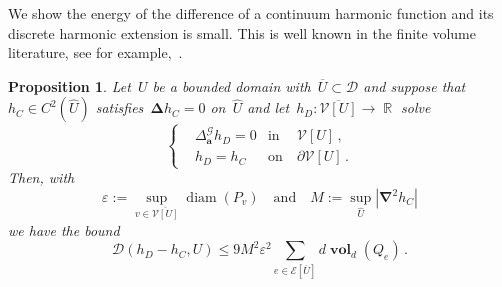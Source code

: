 \documentclass[12pt]{amsart}
\numberwithin{equation}{section}
\DeclareMathOperator{\R}{\mathbb{R}}
\DeclareMathOperator{\diam}{{\mathop{diam}}}
\newtheorem{prop}[theorem]{Proposition}
\newcommand{\V}{\mathcal{V}}
\newcommand{\E}{\mathcal{E}}
\newcommand{\eps}{\varepsilon}
\newcommand{\CLap}{\boldsymbol{\Delta}}
\newcommand{\Cnabla}{\boldsymbol{\nabla}}
\newcommand{\aDelta}{\hyperref[eq:geometric-laplacian]{{\Delta^{\mathcal{G}}_{\cond}}}}
\newcommand{\cond}{\hyperref[eq:geometric-laplacian]{\mathbf{a}}}
\newcommand{\D}{\hyperref[eq:dir.energy]{\mathcal{D}}}
\newcommand{\GCU}{\hyperref[eq:graph-closure]{\widehat{U}}}
\newcommand{\Qe}{\hyperref[eq:qeset]{Q_e}}
\DeclareMathOperator{\vol}{\mathbf{vol}}
\begin{document}
We show the energy of the difference of a continuum harmonic function and its discrete harmonic extension is small. This is well known in the finite volume literature, see for example,~\cite[Theorem 9.3]{eymard2000finite}.
\begin{prop}
	\label{prop:energy-bound}
	Let~$U$ be a bounded domain with~$\overline{U} \subset \mathcal{D}$ and suppose that~$h_C \in C^{2}(\GCU)$ satisfies~$\CLap h_C = 0$ on~$\GCU$ and let~$h_D: \overline{\V[U]} \to \R$ solve 
	\[
	\left\{
	\begin{aligned}
		&  \aDelta h_D = 0 & \mbox{in} & \ \V[U] \,,
		\\
		& h_D = h_C & \mbox{on} & \  \partial \V[U] \, . 
	\end{aligned}
	\right.
	\]
	Then, with
	\[
	\eps := \sup_{v \in \overline{\V[U]}} \diam(P_v)
	\quad \mbox{and} \quad M := \sup_{\GCU} |\Cnabla^2 h_C| 
	\]
	we have the bound
	\begin{equation}
		\label{eq:dirichlet-energy-convergence-bound}
	\D(h_D - h_C, U) \leq 9  M^2 \eps^2 \sum_{e \in \E[\overline{U}]} d \vol_{d}(\Qe)   \, .
	\end{equation}
\end{prop}
\end{document}
